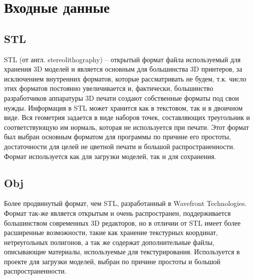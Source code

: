 \clearpage
\section{Входные данные}
\subsection{STL}
STL (от англ. stereolithography) -- открытый формат файла используемый для хранения 3D моделей и является основным для большинства 3D принтеров, за исключением внутренних форматов, которые рассматривать не будем, т.к. число этих форматов постоянно увеличивается и, фактически, большинство разработчиков аппаратуры 3D печати создают собственные форматы под свои нужды. Информация в STL может хранится как в текстовом, так и в двоичном виде. Вся геометрия задается в виде наборов точек, составляющих треугольник и соответствующую им нормаль, которая не используется при печати. Этот формат был выбран основным форматом для программы по причине его простоты, достаточности для целей не цветной печати и большой распространенности. Формат используется как для загрузки моделей, так и для сохранения.
\subsection{Obj}
Более продвинутый формат, чем STL, разработанный в Wavefront Technologies. Формат так-же является открытым и очень распространен, поддерживается большинством современных 3D редакторов, но в отличии от STL имеет более расширенные возможности, такие как хранение текстурных координат, нетреугольных полигонов, а так же содержат дополнительные файлы, описывающие материалы, используемые для текстурирования. Используется в проекте для загрузки моделей, выбран по причине простоты и большой распространенности.
